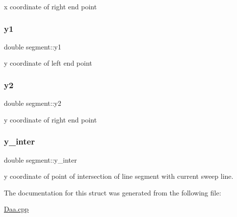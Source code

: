 x coordinate of right end point 

\mbox{\label{structsegment_a16356e18bb4090d65e23bbd86f12377c}} 
\subsubsection{\texorpdfstring{y1}{y1}}
{\footnotesize\ttfamily double segment\+::y1}



y coordinate of left end point 

\mbox{\label{structsegment_a5653d346ca143edd172e00a05de687b9}} 
\subsubsection{\texorpdfstring{y2}{y2}}
{\footnotesize\ttfamily double segment\+::y2}



y coordinate of right end point 

\mbox{\label{structsegment_af986053f4372a89b98199298afd6de55}} 
\subsubsection{\texorpdfstring{y\+\_\+inter}{y\_inter}}
{\footnotesize\ttfamily double segment\+::y\+\_\+inter}



y coordinate of point of intersection of line segment with current sweep line. 



The documentation for this struct was generated from the following file\+:\begin{DoxyCompactItemize}
\item 
\hyperlink{_daa_8cpp}{Daa.\+cpp}\end{DoxyCompactItemize}
